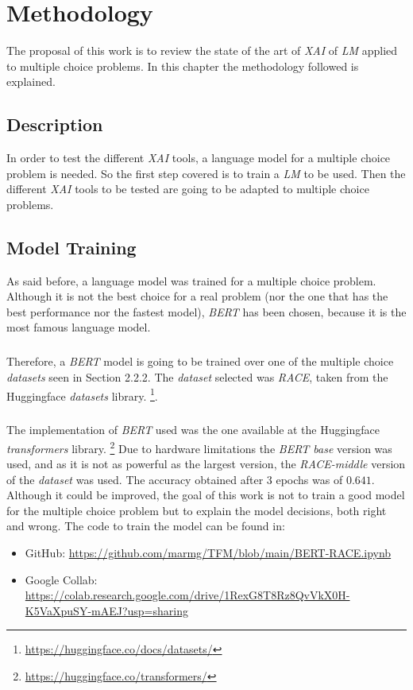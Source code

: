 \chapter{Methodology}
\label{ch:Methodology}
\noindent The proposal of this work is to review the state of the art of \emph{XAI} of \emph{LM} applied to multiple choice problems. In this chapter the methodology followed is explained.
\section{Description}
\label{sec:Description}
\noindent In order to test the different \emph{XAI} tools, a language model for a multiple choice problem is needed. So the first step covered is to train a \emph{LM} to be used. Then the different \emph{XAI} tools to be tested are going to be adapted to multiple choice problems.
\section{Model Training}
\label{sec:Model training}
\noindent As said before, a language model was trained for a multiple choice problem. Although it is not the best choice for a real problem (nor the one that has the best performance nor the fastest model), \emph{BERT} has been chosen, because it is the most famous language model. 
\paragraph{}
Therefore, a \emph{BERT} model is going to be trained over one of the multiple choice \emph{datasets} seen in Section 2.2.2. The \emph{dataset} selected was \emph{RACE}, taken from the Huggingface \emph{datasets} library. \footnote{\url{https://huggingface.co/docs/datasets/}}. 
\paragraph{}
The implementation of \emph{BERT} used was the one available at the Huggingface \emph{transformers} library. \footnote{\url{https://huggingface.co/transformers/}} Due to hardware limitations the \emph{BERT base} version was used, and as it is not as powerful as the largest version, the \emph{RACE-middle} version of the \emph{dataset} was used. The accuracy obtained after 3 epochs was of $0.641$. Although it could be improved, the goal of this work is not to train a good model for the multiple choice problem but to explain the model decisions, both right and wrong. The code to train the model can be found in:
\begin{itemize}
	\item GitHub: \url{https://github.com/marmg/TFM/blob/main/BERT-RACE.ipynb}
	\item Google Collab: \url{https://colab.research.google.com/drive/1RexG8T8Rz8QvVkX0H-K5VaXpuSY-mAEJ?usp=sharing}
\end{itemize}

